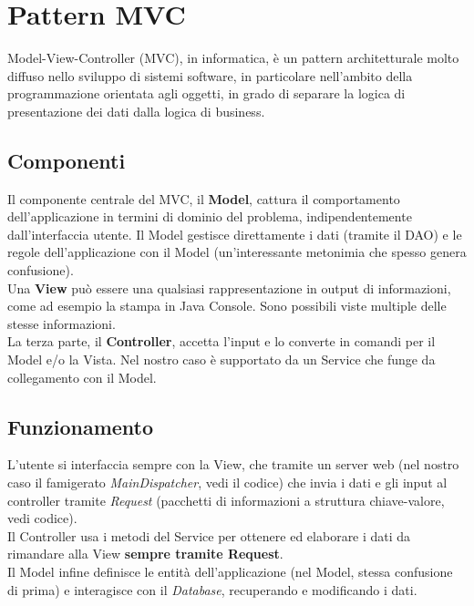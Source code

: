 \documentclass[a4paper,12 pt]{article}
\begin{document}
	\section{Pattern MVC}
	
		Model-View-Controller (MVC), in informatica, è un pattern architetturale molto diffuso nello sviluppo di sistemi software, in particolare nell'ambito della programmazione orientata agli oggetti, in grado di separare la logica di presentazione dei dati dalla logica di business.
		
		\subsection{Componenti}
			Il componente centrale del MVC, il \textbf{Model}, cattura il comportamento dell'applicazione in termini di dominio del problema, indipendentemente dall'interfaccia utente. Il Model gestisce direttamente i dati (tramite il DAO) e le regole dell'applicazione con il Model (un'interessante metonimia che spesso genera confusione). \\
			
			\noindent Una \textbf{View} può essere una qualsiasi rappresentazione in output di informazioni, come ad esempio la stampa in Java Console. Sono possibili viste multiple delle stesse informazioni.\\
			
			\noindent La terza parte, il \textbf{Controller}, accetta l'input e lo converte in comandi per il Model e/o la Vista. Nel nostro caso è supportato da un Service che funge da collegamento con il Model.\\
		
		\subsection{Funzionamento}
			L'utente si interfaccia sempre con la View, che tramite un server web (nel nostro caso il famigerato \textit{MainDispatcher}, vedi il codice) che invia i dati e gli input al controller tramite \textit{Request} (pacchetti di informazioni a struttura chiave-valore, vedi codice).\\
			Il Controller usa i metodi del Service per ottenere ed elaborare i dati da rimandare alla View \textbf{sempre tramite Request}.\\
			
			\noindent Il Model infine definisce le entità dell'applicazione (nel Model, stessa confusione di prima) e interagisce con il \textit{Database}, recuperando e modificando i dati.\\
			
\end{document}

